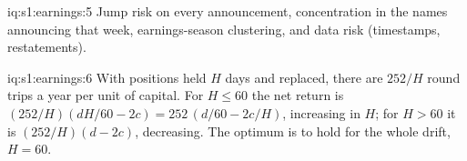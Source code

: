 \begin{solution}{iq:s1:earnings:5}
Jump risk on every announcement, concentration in the names announcing that week, earnings-season clustering, and data risk (timestamps, restatements).
\end{solution}

\begin{solution}{iq:s1:earnings:6}
With positions held $H$ days and replaced, there are $252/H$ round trips a year per unit of capital. For $H \le 60$ the net return is
$(252/H)(dH/60 - 2c) = 252\,(d/60 - 2c/H)$, increasing in $H$; for $H > 60$ it is $(252/H)(d - 2c)$, decreasing. The optimum is to hold for the whole drift,
$H = 60$.
\end{solution}
